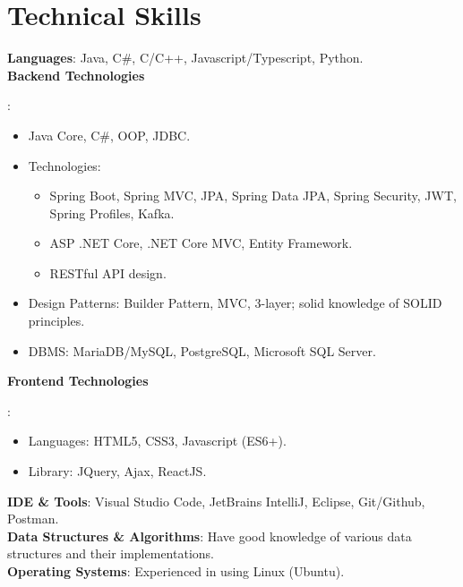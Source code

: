 \section{Technical Skills}
    \begin{itemize}[leftmargin=0.15in, label={}]
    \small{\item{
        \textbf{Languages}{: Java, C\#, C/C++, Javascript/Typescript, Python.} \\
        \textbf{Backend Technologies}{: 
            \vspace{-0.2cm}
            \begin{itemize}[leftmargin=0.5in]
                \item  Java Core, C\#, OOP, JDBC.
                \item Technologies: 
                \begin{itemize}
                    \item Spring Boot, Spring MVC, JPA, Spring Data JPA, Spring Security, JWT, Spring Profiles, Kafka.
                    \item ASP .NET Core, .NET Core MVC, Entity Framework.
                    \item RESTful API design.
                \end{itemize}
                \item Design Patterns: Builder Pattern, MVC, 3-layer; solid knowledge of SOLID principles.
                \item DBMS: MariaDB/MySQL, PostgreSQL, Microsoft SQL Server.
            \end{itemize}
            \vspace{-0.2cm}
        } 
         \textbf{Frontend Technologies}{: 
            \vspace{-0.2cm}
            \begin{itemize}[leftmargin=0.5in]
                \item Languages: HTML5, CSS3, Javascript (ES6+).
                \item Library: JQuery, Ajax, ReactJS.
            \end{itemize}
            \vspace{-0.2cm}
        } 
        \textbf{IDE \& Tools}{: Visual Studio Code, JetBrains IntelliJ, Eclipse, Git/Github, Postman.}\\
        \textbf{Data Structures \& Algorithms}{: Have good knowledge of  various data structures and their implementations.}\\
        \textbf{Operating Systems}{: Experienced in using Linux (Ubuntu).}
    }}
    \end{itemize}
